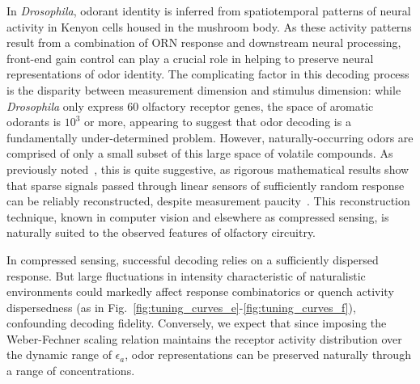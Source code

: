 In \textit{Drosophila}, odorant identity is inferred from spatiotemporal patterns of neural activity in Kenyon cells housed in the mushroom body. As these activity patterns result from a combination of ORN response and downstream neural processing, front-end gain control can play a crucial role in helping to preserve neural representations of odor identity. The complicating factor in this decoding process is the disparity between measurement dimension and stimulus dimension: while \textit{Drosophila} only express 60 olfactory receptor genes, the space of aromatic odorants is $10^3$ or more, appearing to suggest that odor decoding is a fundamentally under-determined problem. However, naturally-occurring odors are comprised of only a small subset of this large space of volatile compounds. As previously noted~\cite{vijay_1}, this is quite suggestive, as rigorous mathematical results show that sparse signals passed through linear sensors of sufficiently random response can be reliably reconstructed, despite measurement paucity~\cite{CS_donoho, CS_tao, CS_ganguli}. %
This reconstruction technique, known in computer vision and elsewhere as compressed sensing, is naturally suited to the observed features of olfactory circuitry. %

In compressed sensing, successful decoding relies on a sufficiently dispersed response. But large fluctuations in intensity characteristic of naturalistic environments could markedly affect response combinatorics or quench activity dispersedness (as in Fig.~\ref{fig:tuning_curves_e}-\ref{fig:tuning_curves_f}), confounding decoding fidelity. Conversely, we expect that since imposing the Weber-Fechner scaling relation maintains the receptor activity distribution over the dynamic range of $\epsilon_a$, odor representations can be preserved naturally through a range of concentrations.







